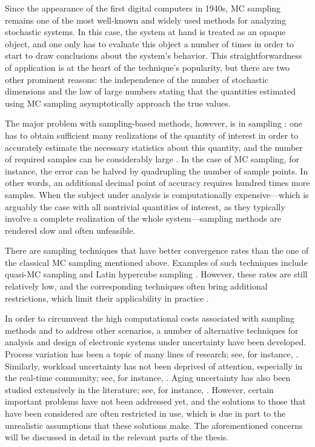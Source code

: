 Since the appearance of the first digital computers in 1940s, \ac{MC} sampling
remains one of the most well-known and widely used methods for analyzing
stochastic systems. In this case, the system at hand is treated as an opaque
object, and one only has to evaluate this object a number of times in order to
start to draw conclusions about the system's behavior. This straightforwardness
of application is at the heart of the technique's popularity, but there are two
other prominent reasons: the independence of the number of stochastic dimensions
and the law of large numbers \cite{durrett2010} stating that the quantities
estimated using \ac{MC} sampling asymptotically approach the true values.

The major problem with sampling-based methods, however, is in sampling \perse:
one has to obtain sufficient many realizations of the quantity of interest in
order to accurately estimate the necessary statistics about this quantity, and
the number of required samples can be considerably large
\cite{diaz-emparanza2002}. In the case of \ac{MC} sampling, for instance, the
error can be halved by quadrupling the number of sample points. In other words,
an additional decimal point of accuracy requires hundred times more samples.
When the subject under analysis is computationally expensive---which is arguably
the case with all nontrivial quantities of interest, as they typically involve a
complete realization of the whole system---sampling methods are rendered slow
and often unfeasible.

There are sampling techniques that have better convergence rates than the one of
the classical \ac{MC} sampling mentioned above. Examples of such techniques
include quasi-\ac{MC} sampling and Latin hypercube sampling \cite{asmussen2007}.
However, these rates are still relatively low, and the corresponding techniques
often bring additional restrictions, which limit their applicability in practice
\cite{xiu2010}.

In order to circumvent the high computational costs associated with sampling
methods and to address other scenarios, a number of alternative techniques for
analysis and design of electronic systems under uncertainty have been developed.
Process variation has been a topic of many lines of research; see, for instance,
\cite{bhardwaj2006, bhardwaj2008, chandra2010, juan2012, lee2013}. Similarly,
workload uncertainty has not been deprived of attention, especially in the
real-time community; see, for instance, \cite{diaz2002, santinelli2011,
quinton2012, tanasa2015}. Aging uncertainty has also been studied extensively in
the literature; see, for instance, \cite{coskun2006, huang2009b, oboril2012,
firouzi2013, kiamehr2013, das2014c}. However, certain important problems have
not been addressed yet, and the solutions to those that have been considered are
often restricted in use, which is due in part to the unrealistic assumptions
that these solutions make. The aforementioned concerns will be discussed in
detail in the relevant parts of the thesis.
